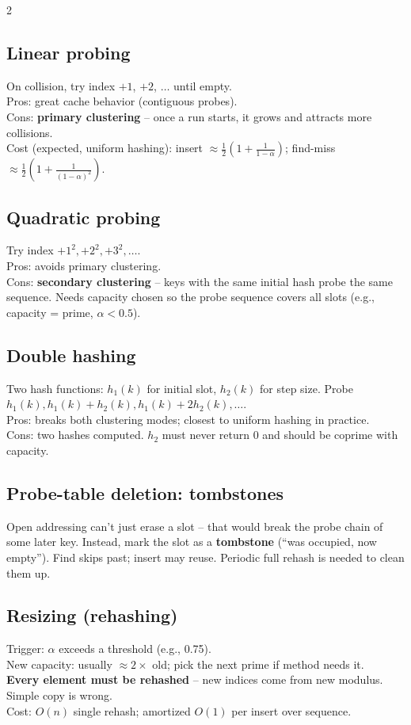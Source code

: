 \documentclass[10pt]{article}
\begin{document}
\begin{multicols}{2}
\subsection*{Linear probing}
On collision, try index $+1$, $+2$, $\ldots$ until empty.\\
Pros: great cache behavior (contiguous probes).\\
Cons: \textbf{primary clustering} -- once a run starts, it grows and
attracts more collisions.\\
Cost (expected, uniform hashing): insert $\approx
\frac{1}{2}(1 + \frac{1}{1-\alpha})$; find-miss $\approx
\frac{1}{2}(1 + \frac{1}{(1-\alpha)^2})$.

\subsection*{Quadratic probing}
Try index $+1^2, +2^2, +3^2, \ldots$.\\
Pros: avoids primary clustering.\\
Cons: \textbf{secondary clustering} -- keys with the same initial hash
probe the same sequence. Needs capacity chosen so the probe sequence
covers all slots (e.g., capacity = prime, $\alpha < 0.5$).

\subsection*{Double hashing}
Two hash functions: $h_1(k)$ for initial slot, $h_2(k)$ for step size.
Probe $h_1(k), h_1(k) + h_2(k), h_1(k) + 2 h_2(k), \ldots$.\\
Pros: breaks both clustering modes; closest to uniform hashing in
practice.\\
Cons: two hashes computed. $h_2$ must never return 0 and should be
coprime with capacity.

\columnbreak

\subsection*{Probe-table deletion: tombstones}
Open addressing can't just erase a slot -- that would break the probe
chain of some later key. Instead, mark the slot as a \textbf{tombstone}
(``was occupied, now empty''). Find skips past; insert may reuse.
Periodic full rehash is needed to clean them up.

\subsection*{Resizing (rehashing)}
Trigger: $\alpha$ exceeds a threshold (e.g., 0.75).\\
New capacity: usually $\approx 2\times$ old; pick the next prime if
method needs it.\\
\textbf{Every element must be rehashed} -- new indices come from new
modulus. Simple copy is wrong.\\
Cost: $O(n)$ single rehash; amortized $O(1)$ per insert over sequence.


\end{multicols}
\end{document}
